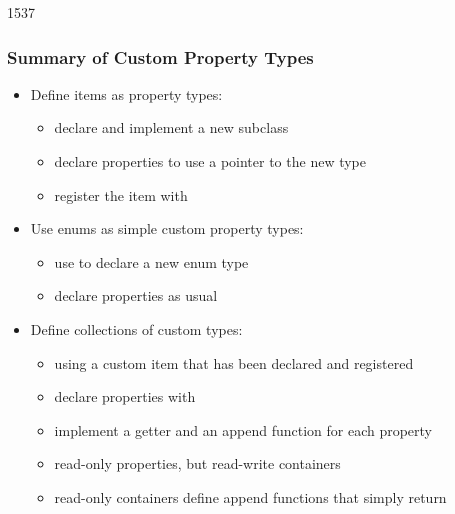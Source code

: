 \begin{slide}[fragile]{1537}\frametitle{Summary of Custom Property Types}

\begin{itemize}
\item Define items as property types:
  \begin{itemize}
  \item declare and implement a new  subclass
  \item declare properties to use a pointer to the new type
  \item register the item with 
  \end{itemize}
\vspace*{1em}
\item Use enums as simple custom property types:
  \begin{itemize}
  \item use  to declare a new enum type
  \item declare properties as usual
  \end{itemize}
\vspace*{1em}
\item Define collections of custom types:
  \begin{itemize}
  \item using a custom item that has been declared and registered
  \item declare properties with 
  \item implement a getter and an append function for each property
  \item read-only properties, but read-write containers
  \item read-only containers define append functions that simply return
  \end{itemize}
\end{itemize}

\end{slide}

